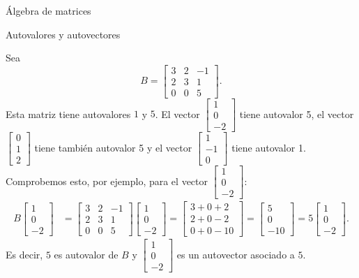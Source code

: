\begin{chapter}{\'Algebra de matrices}
\begin{section}{Autovalores y autovectores}
        \begin{ejemplo}\label{autovalores-3x3} Sea 
            $$
            B = \begin{bmatrix}3&2&{ - 1}\\2&3&1\\0&0&5\end{bmatrix}.
            $$
            Esta matriz tiene autovalores $1$ y  $5$. El vector $\begin{bmatrix}1\\0\\-2\end{bmatrix}$  tiene autovalor 5, el  vector $\begin{bmatrix}0\\1\\2\end{bmatrix}$ tiene también autovalor 5 y el vector $\begin{bmatrix}1\\-1\\0\end{bmatrix}$ tiene autovalor 1. Comprobemos esto,  por ejemplo, para el vector $\begin{bmatrix}1\\0\\-2\end{bmatrix}$:                          
            \begin{align*}
            B\begin{bmatrix}1\\0\\-2\end{bmatrix} &= \begin{bmatrix}3&2&{ - 1}\\2&3&1\\0&0&5\end{bmatrix}\begin{bmatrix}1\\0\\-2\end{bmatrix} = \begin{bmatrix}3+0+2\\2+0-2\\0+0-10\end{bmatrix} = \begin{bmatrix}5\\0\\-10\end{bmatrix} = 5\begin{bmatrix}1\\0\\-2\end{bmatrix}.
            \end{align*}
            Es decir,  $5$ es autovalor de $B$ y $\begin{bmatrix}1\\0\\-2\end{bmatrix}$ es un autovector asociado a $5$.


\end{ejemplo}
\end{section}
\end{chapter}
